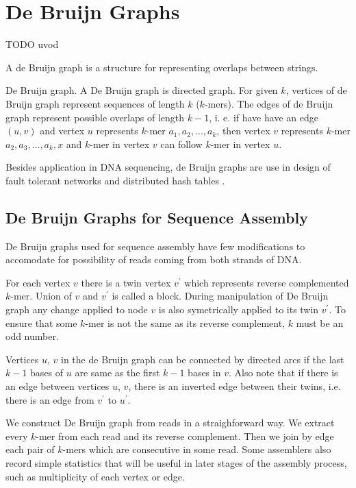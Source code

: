\chapter{De Bruijn Graphs}

TODO uvod

A de Bruijn graph \citep{de1946combinatorial} is a structure for representing
overlaps between strings.

\begin{definition}{De Bruijn graph.}
A De Bruijn graph is directed graph. 
For given $k$, vertices of de Bruijn graph represent sequences of length $k$
($k$-mers). The edges of de Bruijn graph represent possible overlaps of length $k-1$, i. e. 
if have have an edge $(u, v)$ and vertex $u$ represents $k$-mer $a_1, a_2, \dots, a_k$, then
vertex $v$ represents $k$-mer $a_2, a_3, \dots, a_k, x$ and $k$-mer in vertex $v$ can
follow $k$-mer in vertex $u$.
\end{definition}

Besides application in DNA sequencing, de Bruijn graphs are use
in design of fault tolerant networks \citep{ftndeb} and 
distributed hash tables \citep{koorde}.

\section{De Bruijn Graphs for Sequence Assembly}


De Bruijn graphs used for sequence assembly
\citep{pevzner2001eulerian,Velvet} have few modifications
to accomodate for possibility of reads coming from both strands of DNA.

For each vertex $v$ there is a twin vertex $v^{'}$ which
represents reverse complemented $k$-mer. Union of $v$ and $v^{'}$ is called a block.
During manipulation of De Bruijn graph any change applied to node $v$ is also symetrically
applied to its twin $v^{'}$.
To ensure that some $k$-mer is not the same as its reverse complement, $k$ must be an odd number.

Vertices $u$, $v$ in the de Bruijn graph can be connected by directed arcs if the last
$k-1$ bases of $u$ are same as the first $k-1$ bases in $v$. Also note that
if there is an edge between vertices $u$, $v$, there is an inverted edge between their twins,
i.e. there is an edge from $v^{'}$ to $u^{'}$.

We construct De Bruijn graph from reads in a straighforward way.
We extract every $k$-mer from each read and its reverse complement.
Then we join by edge each pair of $k$-mers which are consecutive in some read.
Some assemblers also record simple statistics that will be useful in later
stages of the assembly process, such as multiplicity of each vertex or edge.

